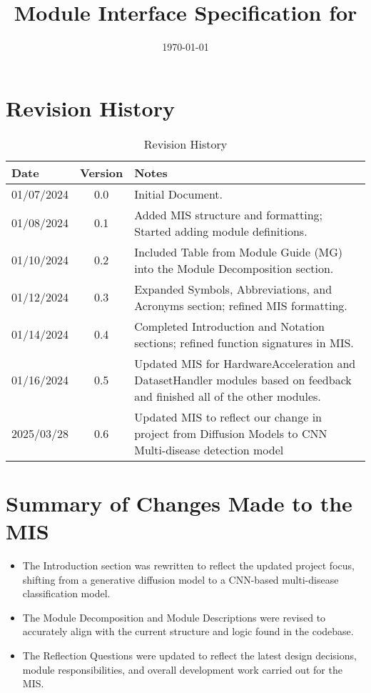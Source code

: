 \documentclass[12pt, titlepage]{article}
\begin{document}
\title{Module Interface Specification for \progname{}}

\author{\authname}

\date{\today}

\maketitle


\section{Revision History}

\renewcommand{\arraystretch}{1.2}
\begin{table}[H]
\centering
\begin{tabularx}{\textwidth}{l c X}
\toprule
\textbf{Date} & \textbf{Version} & \textbf{Notes} \\
\midrule
01/07/2024 & 0.0 & Initial Document. \\
01/08/2024 & 0.1 & Added MIS structure and formatting; Started adding module definitions. \\
01/10/2024 & 0.2 & Included Table from Module Guide (MG) into the Module Decomposition section. \\
01/12/2024 & 0.3 & Expanded Symbols, Abbreviations, and Acronyms section; refined MIS formatting. \\
01/14/2024 & 0.4 & Completed Introduction and Notation sections; refined function signatures in MIS. \\
01/16/2024 & 0.5 & Updated MIS for HardwareAcceleration and DatasetHandler modules based on feedback and finished all of the other modules. \\
2025/03/28 & 0.6 & Updated MIS to reflect our change in project from Diffusion Models to CNN Multi-disease detection model \\
\bottomrule
\end{tabularx}
\caption{Revision History}
\label{tab:revision_history}
\end{table}



\section{Summary of Changes Made to the MIS}

\begin{itemize}
    \item The Introduction section was rewritten to reflect the updated project focus, shifting from a generative diffusion model to a CNN-based multi-disease classification model.
    \item The Module Decomposition and Module Descriptions were revised to accurately align with the current structure and logic found in the codebase.
    \item The Reflection Questions were updated to reflect the latest design decisions, module responsibilities, and overall development work carried out for the MIS.
\end{itemize}
\end{document}
